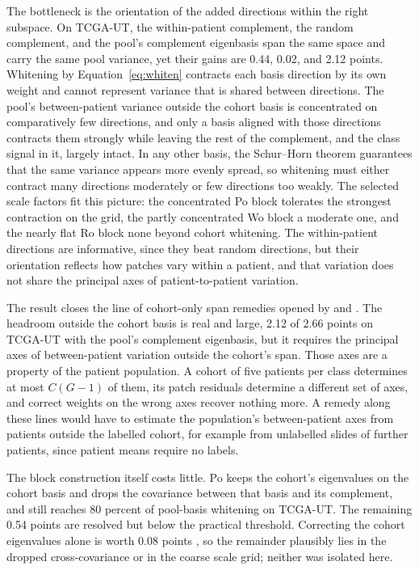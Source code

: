 The bottleneck is the orientation of the added directions within the right subspace. On TCGA-UT, the within-patient complement, the random complement, and the pool's complement eigenbasis span the same space and carry the same pool variance, yet their gains are 0.44, 0.02, and 2.12 points. Whitening by Equation~\ref{eq:whiten} contracts each basis direction by its own weight and cannot represent variance that is shared between directions. The pool's between-patient variance outside the cohort basis is concentrated on comparatively few directions, and only a basis aligned with those directions contracts them strongly while leaving the rest of the complement, and the class signal in it, largely intact. In any other basis, the Schur--Horn theorem guarantees that the same variance appears more evenly spread, so whitening must either contract many directions moderately or few directions too weakly. The selected scale factors fit this picture: the concentrated Po block tolerates the strongest contraction on the grid, the partly concentrated Wo block a moderate one, and the nearly flat Ro block none beyond cohort whitening. The within-patient directions are informative, since they beat random directions, but their orientation reflects how patches vary within a patient, and that variation does not share the principal axes of patient-to-patient variation.

The result closes the line of cohort-only span remedies opened by \citet{queisler2026spectrumRegularization} and \citet{queisler2026withinPatientSpan}. The headroom outside the cohort basis is real and large, 2.12 of 2.66 points on TCGA-UT with the pool's complement eigenbasis, but it requires the principal axes of between-patient variation outside the cohort's span. Those axes are a property of the patient population. A cohort of five patients per class determines at most $C(G-1)$ of them, its patch residuals determine a different set of axes, and correct weights on the wrong axes recover nothing more. A remedy along these lines would have to estimate the population's between-patient axes from patients outside the labelled cohort, for example from unlabelled slides of further patients, since patient means require no labels.

The block construction itself costs little. Po keeps the cohort's eigenvalues on the cohort basis and drops the covariance between that basis and its complement, and still reaches 80 percent of pool-basis whitening on TCGA-UT. The remaining 0.54 points are resolved but below the practical threshold. Correcting the cohort eigenvalues alone is worth 0.08 points \citep{queisler2026spectrumRegularization}, so the remainder plausibly lies in the dropped cross-covariance or in the coarse scale grid; neither was isolated here.

